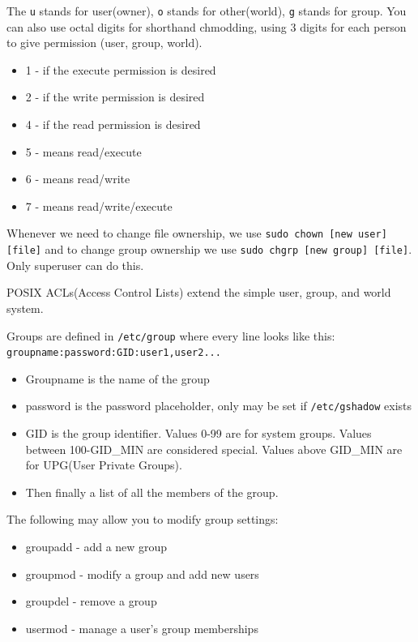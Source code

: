 \documentclass[11pt]{article}
\begin{document}
\noindent The \texttt{u} stands for user(owner), \texttt{o} stands for other(world), \texttt{g} stands for group. You can also use octal digits for shorthand chmodding, using 3 digits for each person to give permission (user, group, world).
\begin{itemize}
    \item 1 - if the execute permission is desired
    \item 2 - if the write permission is desired
    \item 4 - if the read permission is desired
    \item 5 - means read/execute
    \item 6 - means read/write
    \item 7 - means read/write/execute
\end{itemize}

\noindent Whenever we need to change file ownership, we use \texttt{sudo chown [new user] [file]} and to change group ownership we use \texttt{sudo chgrp [new group] [file]}. Only superuser can do this.

\noindent POSIX ACLs(Access Control Lists) extend the simple user, group, and world system. 

\noindent Groups are defined in \texttt{/etc/group} where every line looks like this: \texttt{groupname:password:GID:user1,user2...}

\begin{itemize}
    \item Groupname is the name of the group
    \item password is the password placeholder, only may be set if \texttt{/etc/gshadow} exists
    \item GID is the group identifier. Values 0-99 are for system groups. Values between 100-GID\_MIN are considered special. Values above GID\_MIN are for UPG(User Private Groups).
    \item Then finally a list of all the members of the group.
\end{itemize}

\noindent The following may allow you to modify group settings:
\begin{itemize}
    \item groupadd - add a new group
    \item groupmod - modify a group and add new users
    \item groupdel - remove a group
    \item usermod - manage a user's group memberships
\end{itemize}
\end{document}
